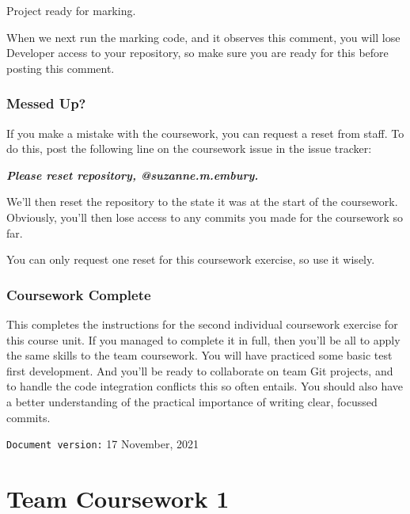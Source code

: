 \documentclass[
]{book}
\newenvironment{Shaded}{\begin{snugshade}}{\end{snugshade}}
\newcommand{\InformationTok}[1]{\textcolor[rgb]{0.56,0.35,0.01}{\textbf{\textit{#1}}}}
\newcommand{\NormalTok}[1]{#1}
\begin{document}
\begin{Shaded}
\begin{Highlighting}[]
\NormalTok{Project ready for marking.}
\end{Highlighting}
\end{Shaded}

When we next run the marking code, and it observes this comment, you will lose Developer access to your repository, so make sure you are ready for this before posting this comment.

\hypertarget{messi}{%
\subsection{Messed Up?}\label{messi}}

If you make a mistake with the coursework, you can request a reset from staff. To do this, post the following line on the coursework issue in the issue tracker:

\begin{Shaded}
\begin{Highlighting}[]
\InformationTok{    Please reset repository, @suzanne.m.embury.}
\end{Highlighting}
\end{Shaded}

We'll then reset the repository to the state it was at the start of the coursework. Obviously, you'll then lose access to any commits you made for the coursework so far.

You can only request one reset for this coursework exercise, so use it wisely.

\hypertarget{cw2fin}{%
\subsection{Coursework Complete}\label{cw2fin}}

This completes the instructions for the second individual coursework exercise for this course unit. If you managed to complete it in full, then you'll be all to apply the same skills to the team coursework. You will have practiced some basic test first development. And you'll be ready to collaborate on team Git projects, and to handle the code integration conflicts this so often entails. You should also have a better understanding of the practical importance of writing clear, focussed commits.

\texttt{Document\ version:} 17 November, 2021

\hypertarget{dealing}{%
\chapter{Team Coursework 1}\label{dealing}}
\end{document}
